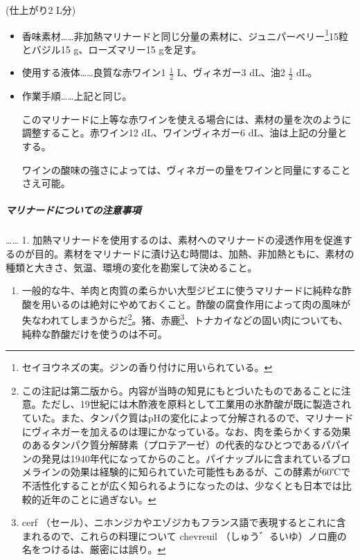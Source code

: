 \begin{recette}

(仕上がり2 L分)

\begin{itemize}
\item
  香味素材\ldots{}\ldots{}非加熱マリナードと同じ分量の素材に、ジュニパーベリー\footnote{セイヨウネズの実。ジンの香り付けに用いられている。}15粒とバジル15
  g、ローズマリー15 gを足す。
\item
  使用する液体\ldots{}\ldots{}良質な赤ワイン1 \(\frac{1}{2}\)
  L、ヴィネガー3 dL、油2 \(\frac{1}{2}\) dL。
\item
  作業手順\ldots{}\ldots{}上記と同じ。

  このマリナードに上等な赤ワインを使える場合には、素材の量を次のように調整すること。赤ワイン12
  dL、ワインヴィネガー6 dL、油は上記の分量とする。

  ワインの酸味の強さによっては、ヴィネガーの量をワインと同量にすることさえ可能。
\end{itemize}

\hypertarget{observation-sur-les-marinades}{%
\subparagraph{マリナードについての注意事項}\label{observation-sur-les-marinades}}

\ldots{}\ldots{} 1.
加熱マリナードを使用するのは、素材へのマリナードの浸透作用を促進するのが目的。素材をマリナードに漬け込む時間は、加熱、非加熱ともに、素材の種類と大きさ、気温、環境の変化を勘案して決めること。

\begin{enumerate}
\def\labelenumi{\arabic{enumi}.}
\setcounter{enumi}{1}
\tightlist
\item
  一般的な牛、羊肉と肉質の柔らかい大型ジビエに使うマリナードに純粋な酢酸を用いるのは絶対にやめておくこと。酢酸の腐食作用によって肉の風味が失なわれてしまうからだ\footnote{この注記は第二版から。内容が当時の知見にもとづいたものであることに注意。ただし、19世紀には木酢液を原料として工業用の氷酢酸が既に製造されていた。また、タンパク質はpHの変化によって分解されるので、マリナードにヴィネガーを加えるのは理にかなっている。なお、肉を柔らかくする効果のあるタンパク質分解酵素（プロテアーゼ）の代表的なひとつであるパパインの発見は1940年代になってからのこと。パイナップルに含まれているブロメラインの効果は経験的に知られていた可能性もあるが、この酵素が60℃で不活性化することが広く知られるようになったのは、少なくとも日本では比較的近年のことに過ぎない。}。猪、赤鹿\footnote{cerf
    （セール）、ニホンジカやエゾジカもフランス語で表現するとこれに含まれるので、これらの料理について
    chevreuil （しゅう゛るいゆ）ノロ鹿の名をつけるは、厳密には誤り。}、トナカイなどの固い肉についても、純粋な酢酸だけを使うのは不可。
\end{enumerate}


\end{recette}
